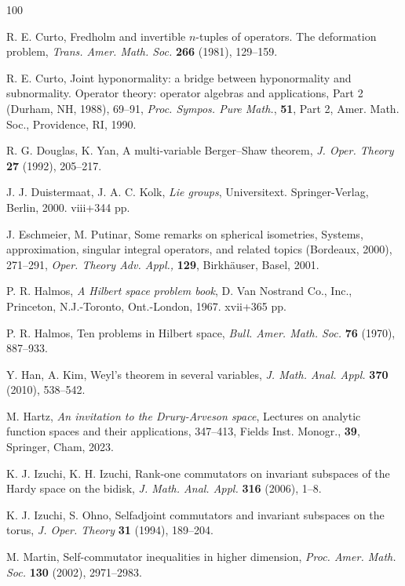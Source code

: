 \documentclass[10pt, a4paper, oneside, reqno]{amsproc}
\numberwithin{equation}{section}
\theoremstyle{remark}
\theoremstyle{definition}
\begin{document}
\begin{thebibliography}{100}

  R. E. Curto, Fredholm and invertible $n$-tuples of operators. The deformation problem,
{\it Trans. Amer. Math. Soc.} {\bf 266} (1981), 129--159.
	 
 R. E. Curto, 
Joint hyponormality: a bridge between hyponormality and subnormality. Operator theory: operator algebras and applications, Part 2 (Durham, NH, 1988), 69--91,
{\it Proc. Sympos. Pure Math.}, {\bf 51}, Part 2, Amer. Math. Soc., Providence, RI, 1990. 

 R. G. Douglas, K. Yan, A multi-variable Berger--Shaw theorem, {\it J. Oper. Theory} {\bf 27} (1992), 205--217. 


 J. J. Duistermaat, J. A. C. Kolk, {\it 
Lie groups}, 
Universitext. Springer-Verlag, Berlin, 2000. viii+344 pp. 
	 
 J. Eschmeier, M. Putinar, Some remarks on spherical isometries, Systems, approximation, singular integral operators, and related topics (Bordeaux, 2000), 271--291,
{\it Oper. Theory Adv. Appl.,} {\bf 129}, Birkhäuser, Basel, 2001.

 P. R. Halmos, {\it A Hilbert space problem book}, D. Van Nostrand Co., Inc., Princeton, N.J.-Toronto, Ont.-London, 1967. xvii+365 pp.

 P. R. Halmos, 
Ten problems in Hilbert space,
{\it Bull. Amer. Math. Soc.} {\bf 76} (1970), 887--933. 

 Y. Han, A. Kim, Weyl's theorem in several variables, {\it J. Math. Anal. Appl.} {\bf 370} (2010),
538--542.

 M. Hartz, 
{\it An invitation to the Drury-Arveson space}, Lectures on analytic function spaces and their applications, 347--413,
Fields Inst. Monogr., {\bf 39}, Springer, Cham, 2023.

 K. J. Izuchi, K. H. Izuchi, Rank-one commutators on invariant subspaces of the Hardy space on the
bidisk, {\it J. Math. Anal. Appl.} {\bf 316} (2006), 1--8.

 K. J. Izuchi, S. Ohno, Selfadjoint commutators and invariant subspaces on the torus, {\it J. Oper. Theory} {\bf 31} (1994), 189--204. 

 M. Martin, Self-commutator inequalities in higher dimension, 
{\it Proc. Amer. Math. Soc.} {\bf 130} (2002), 2971--2983.


\end{thebibliography}
\end{document}
